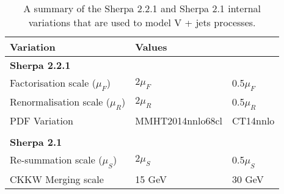 \begin{table}
  \centering
  \begin{tabular}{ l l l }
    \toprule
    \bfseries{Variation} & \multicolumn{2}{l}{\bfseries{Values}} \\
    \midrule
    \multicolumn{3}{l}{\bfseries{Sherpa 2.2.1}} \\
    Factorisation scale ($\mu_F$) & $2\mu_F$ & 0.5$\mu_F$ \\
    Renormalisation scale ($\mu_R$) & $2\mu_R$ & 0.5$\mu_R$ \\
    PDF Variation & MMHT2014nnlo68cl & CT14nnlo \\
    &&\\
    \multicolumn{3}{l}{\bfseries{Sherpa 2.1}} \\
    Re-summation scale ($\mu_S$) & $2\mu_S$ & 0.5$\mu_S$ \\
    CKKW Merging scale & 15 GeV & 30 GeV \\
    \bottomrule
  \end{tabular}
  \caption{A summary of the Sherpa 2.2.1 and Sherpa 2.1 internal variations that
  are used to model V + jets processes.}
  \label{tab:sherpa-variations}
\end{table}